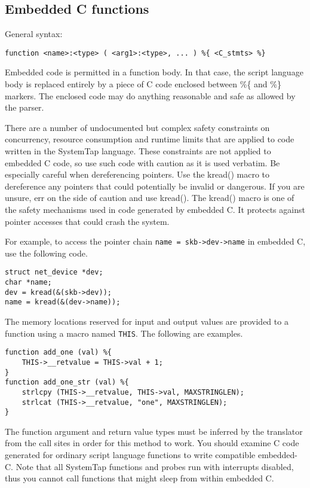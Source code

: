 \documentclass[twoside,english]{article}
\newenvironment{vindent}
{\begin{list}{}{\setlength{\listparindent}{6pt}}
\item[]}
{\end{list}}
\begin{document}
\subsection{Embedded C functions}

General syntax:

\begin{vindent}
\begin{verbatim}
function <name>:<type> ( <arg1>:<type>, ... ) %{ <C_stmts> %}
\end{verbatim}
\end{vindent}
Embedded code is permitted in a function body. In that case, the script language
body is replaced entirely by a piece of C code enclosed between \%\{ and
\%\} markers. The enclosed code may do anything reasonable and safe as allowed
by the parser.

There are a number of undocumented but complex safety constraints on concurrency,
resource consumption and runtime limits that are applied to code written
in the SystemTap language. These constraints are not applied to embedded
C code, so use such code with caution as it is used verbatim. Be especially
careful when dereferencing pointers. Use the kread() macro to dereference
any pointers that could potentially be invalid or dangerous. If you are unsure,
err on the side of caution and use kread(). The kread() macro is one of the
safety mechanisms used in code generated by embedded C. It protects against
pointer accesses that could crash the system.

For example, to access the pointer chain \texttt{name = skb->dev->name} in
embedded C, use the following code.

\begin{vindent}
\begin{verbatim}
struct net_device *dev;
char *name;
dev = kread(&(skb->dev));
name = kread(&(dev->name));
\end{verbatim}
\end{vindent}
The memory locations reserved for input and output values are provided to
a function using a macro named \texttt{THIS}. The following
are examples.

\begin{vindent}
\begin{verbatim}
function add_one (val) %{
    THIS->__retvalue = THIS->val + 1;
}
function add_one_str (val) %{
    strlcpy (THIS->__retvalue, THIS->val, MAXSTRINGLEN);
    strlcat (THIS->__retvalue, "one", MAXSTRINGLEN);
}
\end{verbatim}
\end{vindent}
The function argument and return value types must be inferred by the translator
from the call sites in order for this method to work. You should examine
C code generated for ordinary script language functions to write compatible
embedded-C. Note that all SystemTap functions and probes run with interrupts
disabled, thus you cannot call functions that might sleep from within embedded
C.
\end{document}
